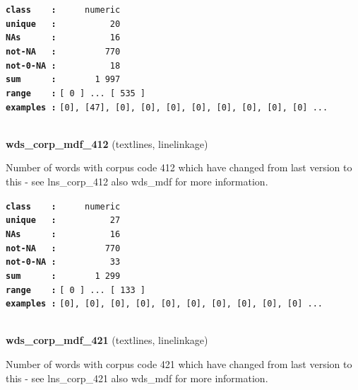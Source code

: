 \documentclass[]{article}
\begin{document}
\textbf{\texttt{class\ \ \ \ :}} \texttt{~~~~~numeric}\\
\textbf{\texttt{unique\ \ \ :}} \texttt{~~~~~~~~~~20}\\
\textbf{\texttt{NAs\ \ \ \ \ \ :}} \texttt{~~~~~~~~~~16}\\
\textbf{\texttt{not-NA\ \ \ :}} \texttt{~~~~~~~~~770}\\
\textbf{\texttt{not-0-NA\ :}} \texttt{~~~~~~~~~~18}\\
\textbf{\texttt{sum\ \ \ \ \ \ :}} \texttt{~~~~~~~1~997}\\
\textbf{\texttt{range\ \ \ \ :}}
\texttt{{[}\ 0\ {]}\ ...\ {[}\ 535\ {]}}\\
\textbf{\texttt{examples\ :}}
\texttt{{[}0{]},\ {[}47{]},\ {[}0{]},\ {[}0{]},\ {[}0{]},\ {[}0{]},\ {[}0{]},\ {[}0{]},\ {[}0{]},\ {[}0{]}\ ...}\\

~

\textbf{wds\_corp\_mdf\_412} (textlines, linelinkage)

Number of words with corpus code 412 which have changed from last
version to this - see lns\_corp\_412 also wds\_mdf for more information.

\textbf{\texttt{class\ \ \ \ :}} \texttt{~~~~~numeric}\\
\textbf{\texttt{unique\ \ \ :}} \texttt{~~~~~~~~~~27}\\
\textbf{\texttt{NAs\ \ \ \ \ \ :}} \texttt{~~~~~~~~~~16}\\
\textbf{\texttt{not-NA\ \ \ :}} \texttt{~~~~~~~~~770}\\
\textbf{\texttt{not-0-NA\ :}} \texttt{~~~~~~~~~~33}\\
\textbf{\texttt{sum\ \ \ \ \ \ :}} \texttt{~~~~~~~1~299}\\
\textbf{\texttt{range\ \ \ \ :}}
\texttt{{[}\ 0\ {]}\ ...\ {[}\ 133\ {]}}\\
\textbf{\texttt{examples\ :}}
\texttt{{[}0{]},\ {[}0{]},\ {[}0{]},\ {[}0{]},\ {[}0{]},\ {[}0{]},\ {[}0{]},\ {[}0{]},\ {[}0{]},\ {[}0{]}\ ...}\\

~

\textbf{wds\_corp\_mdf\_421} (textlines, linelinkage)

Number of words with corpus code 421 which have changed from last
version to this - see lns\_corp\_421 also wds\_mdf for more information.
\end{document}

